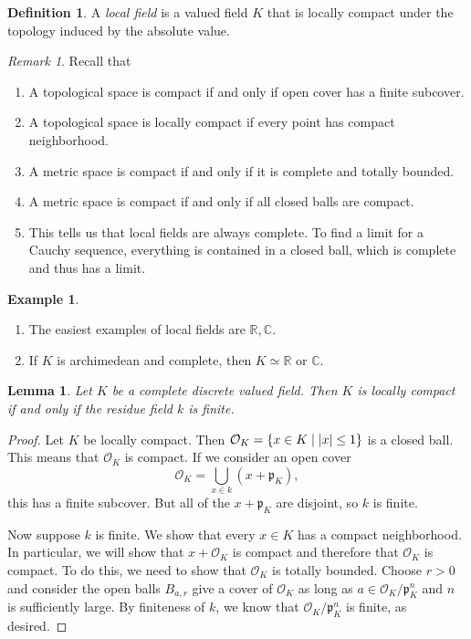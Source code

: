 \documentclass[leqno, openany]{memoir}
\newtheorem{lem}[thm]{Lemma}
\theoremstyle{definition}
\newtheorem{defn}[thm]{Definition}
\newtheorem{exm}[thm]{Example}
\theoremstyle{remark}
\newtheorem{rmk}[thm]{Remark}
\theoremstyle{plain}
\theoremstyle{definition}
\theoremstyle{remark}
\newcommand{\R}{\mathbb{R}}
\newcommand{\C}{\mathbb{C}}
\newcommand{\mc}[1]{\mathcal{#1}}
\newcommand{\mf}[1]{\mathfrak{#1}}
\begin{document}
\begin{defn} A \textit{local field} is a valued field $K$ that is locally
compact under the topology induced by the absolute value.  \end{defn}

\begin{rmk} Recall that \begin{enumerate} \item A topological space is compact
    if and only if open cover has a finite subcover.  \item A topological space
    is locally compact if every point has compact neighborhood.  \item A metric
    space is compact if and only if it is complete and totally bounded.  \item
    A metric space is compact if and only if all closed balls are compact.
\item This tells us that local fields are always complete. To find a limit for
    a Cauchy sequence, everything is contained in a closed ball, which is
    complete and thus has a limit.  \end{enumerate} \end{rmk}

\begin{exm}\leavevmode \begin{enumerate} \item The easiest examples of local
fields are $\R, \C$.  \item If $K$ is archimedean and complete, then $K \simeq
\R$ or $\C$.  \end{enumerate} \end{exm}

\begin{lem} Let $K$ be a complete discrete valued field. Then $K$ is locally
compact if and only if the residue field $k$ is finite.  \end{lem}

\begin{proof} Let $K$ be locally compact. Then $\mc{O}_K = \qty{x \in K \mid
    \abs{x} \leq 1}$ is a closed ball. This means that $\mc{O}_K$ is compact.
    If we consider an open cover \[ \mc{O}_K = \bigcup_{x \in k} (x +
    \mf{p}_K), \] this has a finite subcover. But all of the $x + \mf{p}_K$ are
    disjoint, so $k$ is finite.

    Now suppose $k$ is finite. We show that every $x \in K$ has a compact
neighborhood. In particular, we will show that $x + \mc{O}_K$ is compact and
therefore that $\mc{O}_K$ is compact. To do this, we need to show that
$\mc{O}_K$ is totally bounded. Choose $r > 0$ and consider the open balls
$B_{a,r}$ give a cover of $\mc{O}_K$ as long as $a \in \mc{O}_K / \mf{p}_K^n$
and $n$ is sufficiently large. By finiteness of $k$, we know that $\mc{O}_K
/\mf{p}_K^n$ is finite, as desired.  \end{proof}
\end{document}
